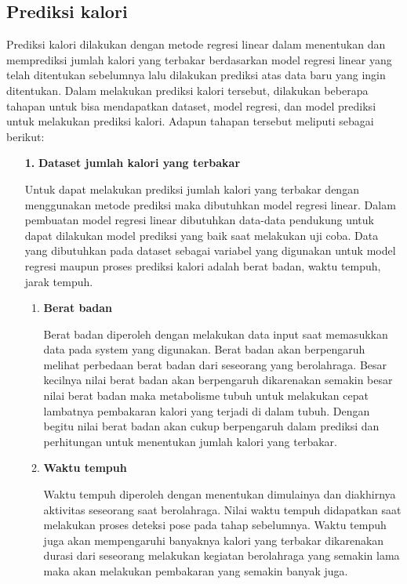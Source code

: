   \subsection{Prediksi kalori}

  Prediksi kalori dilakukan dengan metode regresi linear dalam menentukan dan memprediksi jumlah kalori yang terbakar berdasarkan model regresi linear yang telah ditentukan sebelumnya lalu dilakukan prediksi atas data baru yang ingin ditentukan. Dalam melakukan prediksi kalori tersebut, dilakukan beberapa tahapan untuk bisa mendapatkan dataset, model regresi, dan model prediksi untuk melakukan prediksi kalori. Adapun tahapan tersebut meliputi sebagai berikut:

  
  \begin{enumerate}[listparindent=2em]
  \item[\textbf{1.}] \textbf{Dataset jumlah kalori yang terbakar}
 
    Untuk dapat melakukan prediksi jumlah kalori yang terbakar dengan menggunakan metode prediksi maka dibutuhkan model regresi linear. Dalam pembuatan model regresi linear dibutuhkan data-data pendukung untuk dapat dilakukan model prediksi yang baik saat melakukan uji coba. Data yang dibutuhkan pada dataset sebagai variabel yang digunakan untuk model regresi maupun proses prediksi kalori adalah berat badan, waktu tempuh, jarak tempuh.

    \begin{enumerate}[label=\textbf{\alph*}., listparindent=2em]
      \item \textbf{Berat badan}
      
      Berat badan diperoleh dengan melakukan data input saat memasukkan data pada system yang digunakan. Berat badan akan berpengaruh melihat perbedaan berat badan dari seseorang yang berolahraga. Besar kecilnya nilai berat badan akan berpengaruh dikarenakan semakin besar nilai berat badan maka metabolisme tubuh untuk melakukan cepat lambatnya pembakaran kalori yang terjadi di dalam tubuh. Dengan begitu nilai berat badan akan cukup berpengaruh dalam prediksi dan perhitungan untuk menentukan jumlah kalori yang terbakar.

      \item \textbf{Waktu tempuh}
      
      Waktu tempuh diperoleh dengan menentukan dimulainya dan diakhirnya aktivitas seseorang saat berolahraga. Nilai waktu tempuh didapatkan saat melakukan proses deteksi pose pada tahap sebelumnya. Waktu tempuh juga akan mempengaruhi banyaknya kalori yang terbakar dikarenakan durasi dari seseorang melakukan kegiatan berolahraga yang semakin lama maka akan melakukan pembakaran yang semakin banyak juga.


\end{enumerate}
\end{enumerate}
